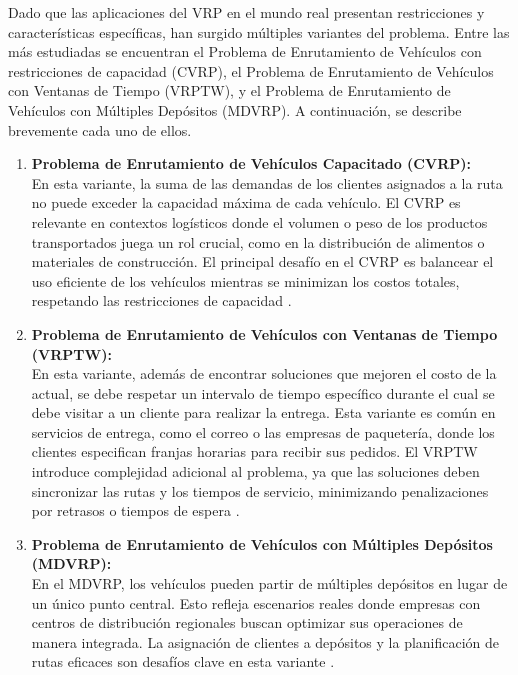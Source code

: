 \documentclass[12pt]{report}
\begin{document}
	Dado que las aplicaciones del VRP en el mundo real presentan restricciones y características específicas, han surgido múltiples variantes del problema. Entre las más estudiadas se encuentran el Problema de Enrutamiento de Vehículos con restricciones de capacidad (CVRP), el Problema de Enrutamiento de Vehículos con Ventanas de Tiempo (VRPTW), y el Problema de Enrutamiento de Vehículos con Múltiples Depósitos (MDVRP). A continuación, se describe brevemente cada uno de ellos.
	\begin{enumerate}
		\item
		\textbf{Problema de Enrutamiento de Vehículos Capacitado (CVRP):}\\
		En esta variante, la suma de las demandas de los clientes asignados a la ruta no puede exceder la capacidad máxima de cada vehículo. El CVRP es relevante en contextos logísticos donde el volumen o peso de los productos transportados juega un rol crucial, como en la distribución de alimentos o materiales de construcción. El principal desafío en el CVRP es balancear el uso eficiente de los vehículos mientras se minimizan los costos totales, respetando las restricciones de capacidad \cite{ref8}.

		\item
		\textbf{Problema de Enrutamiento de Vehículos con Ventanas de Tiempo (VRPTW):}\\
		En esta variante, además de encontrar soluciones que mejoren el costo de la actual, se debe respetar un intervalo de tiempo específico durante el cual se debe visitar a un cliente para realizar la entrega. Esta variante es común en servicios de entrega, como el correo o las empresas de paquetería, donde los clientes especifican franjas horarias para recibir sus pedidos. El VRPTW introduce complejidad adicional al problema, ya que las soluciones deben sincronizar las rutas y los tiempos de servicio, minimizando penalizaciones por retrasos o tiempos de espera \cite{ref11}.

		\item
		\textbf{Problema de Enrutamiento de Vehículos con Múltiples Depósitos (MDVRP):}\\
		En el MDVRP, los vehículos pueden partir de múltiples depósitos en lugar de un único punto central. Esto refleja escenarios reales donde empresas con centros de distribución regionales buscan optimizar sus operaciones de manera integrada. La asignación de clientes a depósitos y la planificación de rutas eficaces son desafíos clave en esta variante \cite{ref3}.
	\end{enumerate}
\end{document}
